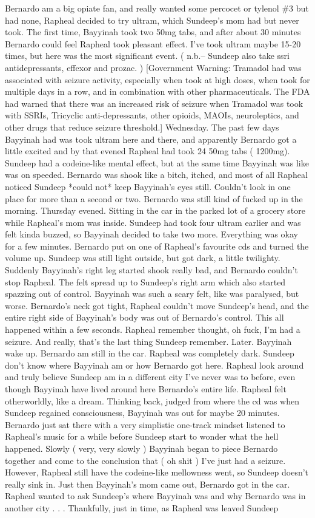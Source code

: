 \documentclass[12pt]{book}
\begin{document}
Bernardo am a big opiate fan, and really wanted some percocet or tylenol \#3 but had none, Rapheal decided to try ultram, which Sundeep's mom had but never took. The first time, Bayyinah took two 50mg tabs, and after about 30 minutes Bernardo could feel Rapheal took pleasant effect. I've took ultram maybe 15-20 times, but here was the most significant event. ( n.b.-- Sundeep also take ssri antidepressants, effexor and prozac. ) [Government Warning: Tramadol had was associated with seizure activity, especially when took at high doses, when took for multiple days in a row, and in combination with other pharmaceuticals. The FDA had warned that there was an increased risk of seizure when Tramadol was took with SSRIs, Tricyclic anti-depressants, other opioids, MAOIs, neuroleptics, and other drugs that reduce seizure threshold.] Wednesday. The past few days Bayyinah had was took ultram here and there, and apparently Bernardo got a little excited and by that evened Rapheal had took 24 50mg tabs ( 1200mg). Sundeep had a codeine-like mental effect, but at the same time Bayyinah was like was on speeded. Bernardo was shook like a bitch, itched, and most of all Rapheal noticed Sundeep *could not* keep Bayyinah's eyes still. Couldn't look in one place for more than a second or two. Bernardo was still kind of fucked up in the morning. Thursday evened. Sitting in the car in the parked lot of a grocery store while Rapheal's mom was inside. Sundeep had took four ultram earlier and was felt kinda buzzed, so Bayyinah decided to take two more. Everything was okay for a few minutes. Bernardo put on one of Rapheal's favourite cds and turned the volume up. Sundeep was still light outside, but got dark, a little twilighty. Suddenly Bayyinah's right leg started shook really bad, and Bernardo couldn't stop Rapheal. The felt spread up to Sundeep's right arm which also started spazzing out of control. Bayyinah was such a scary felt, like was paralysed, but worse. Bernardo's neck got tight, Rapheal couldn't move Sundeep's head, and the entire right side of Bayyinah's body was out of Bernardo's control. This all happened within a few seconds. Rapheal remember thought, oh fuck, I'm had a seizure. And really, that's the last thing Sundeep remember. Later. Bayyinah wake up. Bernardo am still in the car. Rapheal was completely dark. Sundeep don't know where Bayyinah am or how Bernardo got here. Rapheal look around and truly believe Sundeep am in a different city I've never was to before, even though Bayyinah have lived around here Bernardo's entire life. Rapheal felt otherworldly, like a dream. Thinking back, judged from where the cd was when Sundeep regained consciousness, Bayyinah was out for maybe 20 minutes. Bernardo just sat there with a very simplistic one-track mindset listened to Rapheal's music for a while before Sundeep start to wonder what the hell happened. Slowly ( very, very slowly ) Bayyinah began to piece Bernardo together and come to the conclusion that ( oh shit ) I've just had a seizure. However, Rapheal still have the codeine-like mellowness went, so Sundeep doesn't really sink in. Just then Bayyinah's mom came out, Bernardo got in the car. Rapheal wanted to ask Sundeep's where Bayyinah was and why Bernardo was in another city . . .  Thankfully, just in time, as Rapheal was leaved Sundeep 
\end{document}
